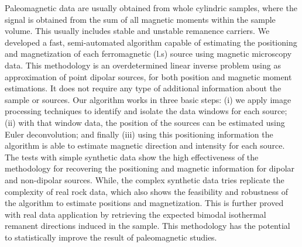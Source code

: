 Paleomagnetic data are usually obtained from whole cylindric samples, where the signal is obtained from the sum of all magnetic moments within the sample volume. This usually includes stable and unstable remanence carriers. We developed a fast, semi-automated algorithm capable of estimating the positioning and magnetization of each ferromagnetic (l.s) source using magnetic microscopy data. This methodology is an overdetermined linear inverse problem using as approximation of point dipolar sources, for both position and magnetic moment estimations. It does not require any type of additional information about the sample or sources. Our algorithm works in three basic steps: (i) we apply image processing techniques to identify and isolate the data windows for each source; (ii) with that window data, the position of the sources can be estimated using Euler deconvolution; and finally (iii) using this positioning information the algorithm is able to estimate magnetic direction and intensity for each source. The tests with simple synthetic data show the high effectiveness of the methodology for recovering the positioning and magnetic information for dipolar and non-dipolar sources. While, the complex synthetic data tries replicate the complexity of real rock data, which also shows the feasibility and robustness of the algorithm to estimate positions and magnetization. This is further proved with real data application by retrieving the expected bimodal isothermal remanent directions induced in the sample. This methodology has the potential to statistically improve the result of paleomagnetic studies. 